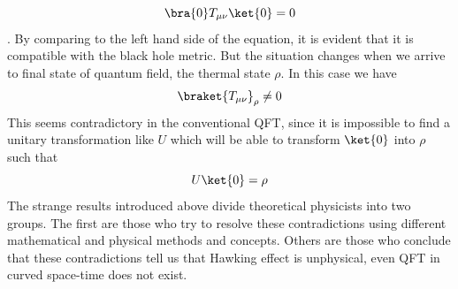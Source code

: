 \documentclass[12pt]{article}
\begin{document}
\begin{equation}\label{eqn.vacuum2}
\bra{0}T_{\mu\nu}\ket{0}=0
\end{equation}.
By comparing to the left hand side of the equation, it is evident that it is compatible with the black hole metric. But the situation changes when we arrive to final state of quantum field, the thermal state $\rho$.
In this case we have
\begin{equation}\label{eqn.thermal}
\braket{T_{\mu\nu}}_{\rho}\neq 0
\end{equation}
This seems contradictory in the conventional QFT, since it is impossible to find a unitary transformation like $U$ which will be able to transform $\ket{0}$ into $\rho$ such that
\begin{equation}\label{eqn.vacuum to thermal}
U\ket{0}=\rho
\end{equation}
The strange results introduced above divide theoretical physicists into two groups. The first are those who try to resolve these contradictions using different mathematical and physical methods and concepts. Others are those who conclude that these contradictions tell us that Hawking effect is unphysical, even QFT in curved space-time does not exist.
\end{document}
